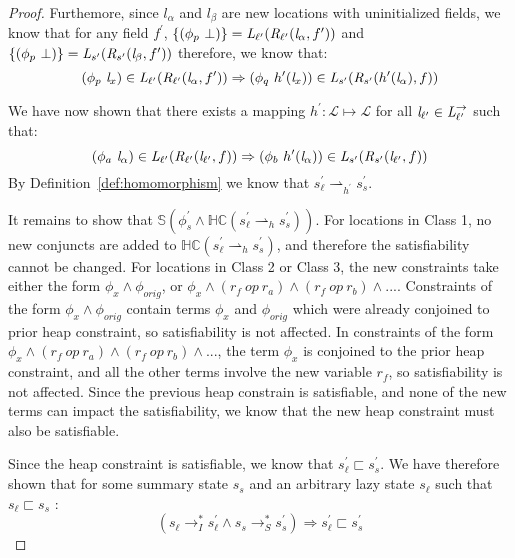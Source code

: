 \begin{proof}
Furthemore, since $l_\alpha$ and $l_\beta$ are new locations with uninitialized fields, we know that for any field $f^\prime$, $\{(\phi_p\ \bot)\} = \emph{L}_{\ell^\prime}(\emph{R}_{\ell^\prime} (\emph{l}_\alpha,f^\prime ))$ and $ \{(\phi_p\ \bot)\} = \emph{L}_{s^\prime}(\emph{R}_{s^\prime} (\emph{l}_\beta,f^\prime ))$ therefore, we know that:
$$(\phi_p\ \emph{l}_x) \in \emph{L}_{\ell^\prime}(\emph{R}_{\ell^\prime} (\emph{l}_\alpha,f^\prime )) \Rightarrow (\phi_q\ h^\prime (\emph{l}_x))\in \emph{L}_{s^\prime}(\emph{R}_{s^\prime} ( h^\prime(\emph{l}_\alpha),f ))$$

We have now shown that there exists a mapping $h^\prime: \mathcal{L} \mapsto \mathcal{L}$ for all $\emph{l}_{\ell^\prime} \in \emph{L}_{\ell^\prime}^\rightarrow$ such that:
$$ (\phi_a\ \emph{l}_\alpha) \in \emph{L}_{\ell^\prime}(\emph{R}_{\ell^\prime} (\emph{l}_{\ell^\prime},f )) \Rightarrow (\phi_b\ h^\prime (\emph{l}_\alpha))\in \emph{L}_{s^\prime}(\emph{R}_{s^\prime} (\emph{l}_{\ell^\prime},f )) $$
By Definition~\ref{def:homomorphism} we know that $s_\ell^\prime \rightharpoonup_{h^\prime} s_s^\prime$. 

It remains to show that $\mathbb{S}( \phi_s^\prime \wedge \mathbb{HC}(s_\ell^\prime \rightharpoonup_{h} s_s^\prime) )$. For locations in Class 1, no new conjuncts are added to $\mathbb{HC}(s_\ell^\prime \rightharpoonup_{h} s_s^\prime)$, and therefore the satisfiability cannot be changed. For locations in Class 2 or Class 3, the new constraints take either the form $\phi_x \wedge \phi_{orig}$, or $\phi_x \wedge (r_f\ op\ r_{a}) \wedge (r_f\ op\ r_{b}) \wedge ...$. Constraints of the form  $\phi_x \wedge \phi_{orig}$ contain terms $\phi_x$ and $\phi_{orig}$ which were already conjoined to prior heap constraint, so satisfiability is not affected. In constraints of the form $\phi_x \wedge (r_f\ op\ r_{a}) \wedge (r_f\ op\ r_{b}) \wedge ...$, the term $\phi_x$ is conjoined to the prior heap constraint, and all the other terms involve the new variable $r_f$, so satisfiability is not affected. Since the previous heap constrain is satisfiable, and none of the new terms can impact the satisfiability, we know that the new heap constraint must also be satisfiable.

Since the heap constraint is satisfiable, we know that $s_\ell^\prime \sqsubset s_s^\prime $. We have therefore shown that for some summary state $s_s$ and an arbitrary lazy state $s_\ell$ such that $s_\ell \sqsubset s_s$ :
\begin{equation} 
(s_\ell \rightarrow_I^* s_\ell^\prime \wedge s_s \rightarrow_S^* s_s^\prime) \Rightarrow s_\ell^\prime \sqsubset s_s^\prime 
\end{equation}



\end{proof}
